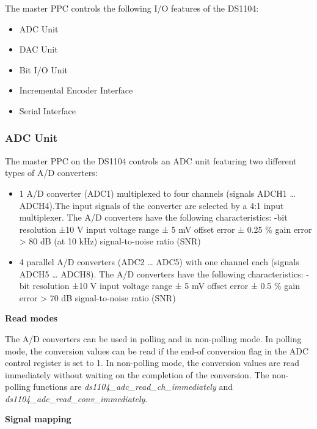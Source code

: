 The master PPC controls the following I/O features of the DS1104:

\begin{itemize}
    \item ADC Unit
    \item DAC Unit
    \item Bit I/O Unit
    \item Incremental Encoder Interface
    \item Serial Interface
\end{itemize}

\subsubsection{ADC Unit}
The master PPC on the DS1104 controls an ADC unit featuring two
different types of A/D converters:
\begin{itemize}
    \item 1 A/D converter (ADC1) multiplexed to four channels (signals ADCH1 … ADCH4).The input signals of the converter are selected by a 4:1 input multiplexer. The A/D converters have the following characteristics:
    -bit resolution
    \subitem ±10 V input voltage range
    \subitem ± 5 mV offset error
    \subitem ± 0.25 \% gain error
    \subitem > 80 dB (at 10 kHz) signal-to-noise ratio (SNR)
    \item 4 parallel A/D converters (ADC2 … ADC5) with one channel each (signals ADCH5 … ADCH8). The A/D converters have the following characteristics:
    -bit resolution
    \subitem ±10 V input voltage range
    \subitem ± 5 mV offset error
    \subitem ± 0.5 \% gain error
    \subitem > 70 dB signal-to-noise ratio (SNR)
\end{itemize}
\textbf{Read modes}\par
The A/D converters can be used in polling and in non-polling mode. In polling mode, the conversion values can be read if the end-of conversion flag in the ADC control register is set to 1. In non-polling mode, the conversion values are read immediately without waiting on the completion of the conversion. The non-polling functions are \textit{ds1104\_adc\_read\_ch\_immediately} and \textit{ds1104\_adc\_read\_conv\_immediately}.

\noindent \textbf{Signal mapping}\par



